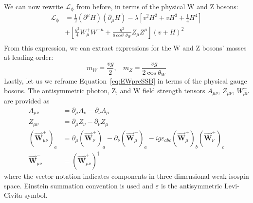 We can now rewrite $\mathcal{L}_\mathrm{\phi}$ from before, in terms of the physical W and Z bosons:
\begin{equation}
\label{eq:LhiggsWZ}
\begin{split}
\mathcal{L}_\mathrm{\phi} & = \frac{1}{2} (\partial^\mu H) (\partial_\mu H) - \lambda\left[ v^2H^2 + vH^3 + \frac{1}{4}H^4\right] \\
& + \left[ \frac{g^2}{4} W^+_\mu W^{{-}\mu}  + \frac{g^2}{8\:\mathrm{cos}^2\:\theta_W} Z_\mu Z^\mu \right](v+H)^2   \\
\end{split}
\end{equation}
From this expression, we can extract expressions for the W and Z bosons' masses at leading-order:
\begin{equation}
\label{eq:WZmass}
m_W = \frac{v g}{2},\:\:\:\:m_Z = \frac{vg}{2\:\mathrm{cos}\:\theta_W}
\end{equation}
Lastly, let us we reframe Equation~\ref{eq:EWpreSSB} in terms of the physical gauge bosons.
The antisymmetric photon, Z, and W field strength tensors $A_{\mu\nu}$, $Z_{\mu\nu}$, $W^{\pm}_{\mu\nu}$ are provided as
\begin{equation}
\begin{split}
A_{\mu\nu} &= \partial_\mu A_\nu - \partial_\nu A_\mu \\
Z_{\mu\nu} &= \partial_\mu Z_\nu - \partial_\nu Z_\mu \\
(\vec{\mathbf{W}}^{+}_{\mu\nu})_a &= \partial_\mu (\vec{\mathbf{W}}^{+}_\nu)_a - \partial_\nu (\vec{\mathbf{W}}^{+}_\mu)_a - ig\varepsilon_{abc}(\vec{\mathbf{W}}^{+}_\mu)_b (\vec{\mathbf{W}}^{+}_\nu)_c \\
\vec{\mathbf{W}}^{-}_{\mu\nu} &= (\vec{\mathbf{W}}^{+}_{\mu\nu})^\dagger
\end{split}
\end{equation}
where the vector notation indicates components in three-dimensional weak isospin space.
Einstein summation convention is used and $\varepsilon$ is the antisymmetric Levi-Civita symbol.

